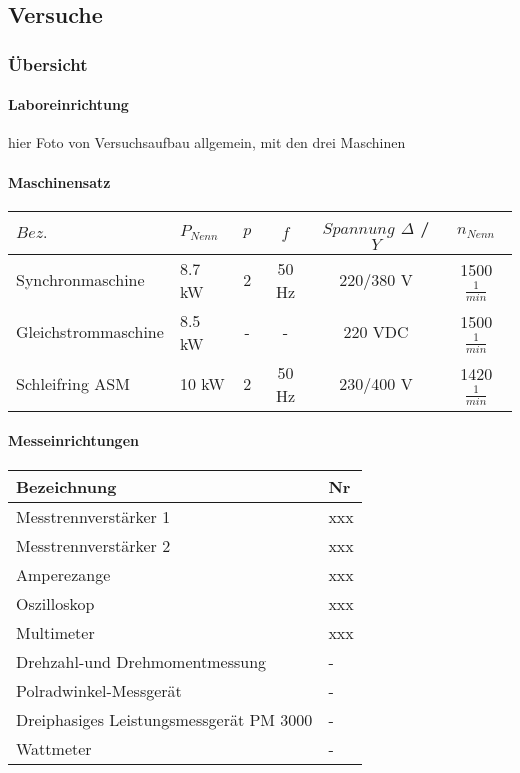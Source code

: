 \begin{flushleft}
\part{Versuche}




\section{Übersicht}

\subsection{Laboreinrichtung}


hier Foto von Versuchsaufbau allgemein, mit den drei Maschinen

\subsection{Maschinensatz}








\begin{tabular}{|L{5cm}|l|c|c|c|c|}
 \hline
  \textbf{$Bez.$} & \textbf{$P_{Nenn}$} & \textbf{$p$} & \textbf{$f$} & \textbf{$Spannung$ $\Delta$ / $Y$} & \textbf{$n_{Nenn}$}  \\
 \hline
Synchronmaschine&8.7 kW &2 &50 Hz&220/380 V&1500 $\frac{1}{min}$\\
\hline
Gleichstrommaschine&8.5 kW & - & - & 220 VDC& 1500 $\frac{1}{min}$\\
\hline
Schleifring ASM &10 kW &2&50 Hz& 230/400 V& 1420 $\frac{1}{min}$\\
\hline

\end{tabular}






\subsection{Messeinrichtungen}




\begin{tabular}{|L{0.8 \textwidth}|l|}
 \hline
  \textbf{Bezeichnung} & \textbf{Nr}  \\
 \hline
 Messtrennverstärker 1  & xxx  \\
\hline
Messtrennverstärker 2  & xxx  \\
\hline
Amperezange  & xxx  \\
\hline
Oszilloskop  & xxx  \\
\hline
Multimeter  & xxx  \\
\hline
Drehzahl-und Drehmomentmessung  & -  \\
\hline
Polradwinkel-Messgerät  & -  \\
\hline
Dreiphasiges Leistungsmessgerät PM 3000  & -  \\
\hline
Wattmeter   & -  \\
\hline
\end{tabular}



\end{flushleft}
